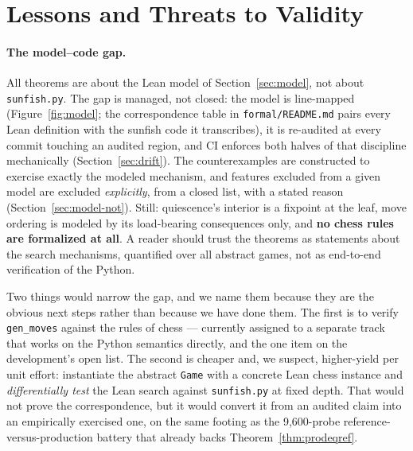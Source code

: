 \documentclass[11pt]{article}
\theoremstyle{plain}
\theoremstyle{definition}
\theoremstyle{remark}
\begin{document}
\section{Lessons and Threats to Validity}
\label{sec:lessons}

\paragraph{The model--code gap.}
All theorems are about the Lean model of Section~\ref{sec:model}, not
about \texttt{sunfish.py}.  The gap is managed, not closed: the model
is line-mapped (Figure~\ref{fig:model}; the correspondence table in
\texttt{formal/README.md} pairs every Lean definition with the sunfish
code it transcribes), it is re-audited at every commit touching an
audited region, and CI enforces both halves of that discipline
mechanically (Section~\ref{sec:drift}).  The counterexamples are
constructed to exercise exactly the modeled mechanism, and features
excluded from a given model are excluded \emph{explicitly}, from a
closed list, with a stated reason (Section~\ref{sec:model-not}).
Still: quiescence's interior is a fixpoint at the leaf, move ordering
is modeled by its load-bearing consequences only, and \textbf{no chess
rules are formalized at all}.  A reader should trust the theorems as
statements about the search mechanisms, quantified over all abstract
games, not as end-to-end verification of the Python.

Two things would narrow the gap, and we name them because they are the
obvious next steps rather than because we have done them.  The first is
to verify \texttt{gen\_moves} against the rules of chess --- currently
assigned to a separate track that works on the Python semantics
directly, and the one item on the development's open list.  The second
is cheaper and, we suspect, higher-yield per unit effort: instantiate
the abstract \texttt{Game} with a concrete Lean chess instance and
\emph{differentially test} the Lean search against \texttt{sunfish.py}
at fixed depth.  That would not prove the correspondence, but it would
convert it from an audited claim into an empirically exercised one, on
the same footing as the 9{,}600-probe reference-versus-production
battery that already backs Theorem~\ref{thm:prodeqref}.
\end{document}
